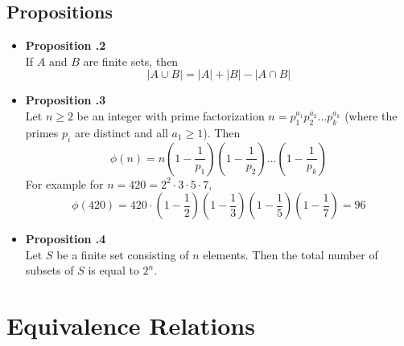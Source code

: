 \documentclass[a4paper,12pt]{article}
\newcommand{\prop}[1]{
    \item \textbf{Proposition \thesection.#1}\\
}
\begin{document}
\subsection{Propositions}
\begin{itemize}
    \prop 2
    If $A$ and $B$ are finite sets, then
        $$ |A \cup B| = |A| + |B| - |A \cap B| $$
        
    \prop 3
    Let $n \ge 2$ be an integer with prime factorization $n = p_1^{a_1}p_2^{a_2} \ldots p_k^{a_k}$
    (where the primes $p_i$ are distinct and all $a_1 \ge 1$). Then
        $$ \phi(n) = n \left(1-\frac{1}{p_1}\right)\left(1-\frac{1}{p_2}\right) \ldots \left(1-\frac{1}{p_k}\right) $$
    For example for $n = 420 = 2^2 \cdot 3 \cdot 5 \cdot 7 $,
        $$ \phi(420) = 420 \cdot \left(1-\frac{1}{2}\right)\left(1-\frac{1}{3}\right)\left(1-\frac{1}{5}\right)\left(1-\frac{1}{7}\right) = 96 $$
        
    \prop 4
    Let $S$ be a finite set consisting of $n$ elements. Then the total number
    of subsets of $S$ is equal to $2^n$.
\end{itemize}

\section{Equivalence Relations}
\end{document}
